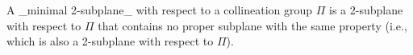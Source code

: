 A _minimal 2-subplane_ with respect to a collineation group $\Pi$ is a 2-subplane with respect to $\Pi$ that contains no proper subplane with the same property (i.e., which is also a 2-subplane with respect to $\Pi$).
